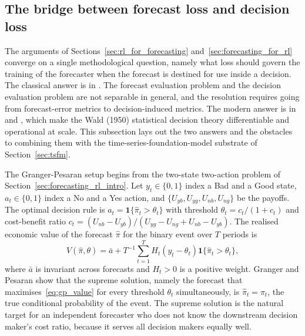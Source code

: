 \subsection{The bridge between forecast loss and decision loss}
\label{sec:bridge}

The arguments of Sections~\ref{sec:rl_for_forecasting} and~\ref{sec:forecasting_for_rl}
converge on a single methodological question, namely what loss should govern the
training of the forecaster when the forecast is destined for use inside a
decision. The classical answer is in \citet{GrangerPesaran2000}. The forecast
evaluation problem and the decision evaluation problem are not separable in
general, and the resolution requires going from forecast-error metrics to
decision-induced metrics. The modern answer is in
\citet{ElmachtoubGrigas2022} and \citet{DontiAmosKolter2017}, which make the
Wald (1950) statistical decision theory differentiable and operational at
scale. This subsection lays out the two answers and the obstacles to combining
them with the time-series-foundation-model substrate of
Section~\ref{sec:tsfm}.

The Granger-Pesaran setup begins from the two-state two-action problem of
Section~\ref{sec:forecasting_rl_intro}. Let $y_t \in \{0, 1\}$ index a Bad and
a Good state, $a_t \in \{0, 1\}$ index a No and a Yes action, and
$\{U_{yb}, U_{yg}, U_{nb}, U_{ng}\}$ be the payoffs. The optimal decision rule
is $a_t = \mathbf 1\{\hat\pi_t > \theta_t\}$ with threshold
$\theta_t = c_t / (1 + c_t)$ and cost-benefit ratio
$c_t = (U_{nb} - U_{yb}) / (U_{yg} - U_{ng} + U_{nb} - U_{yb})$. The realised
economic value of the forecast $\hat\pi$ for the binary event over $T$ periods
is
\begin{equation}
V(\hat\pi, \theta) = \bar a +
  T^{-1} \sum_{t=1}^T H_t (y_t - \theta_t)
  \mathbf 1\{\hat\pi_t > \theta_t\},
\label{eq:gp_value}
\end{equation}
where $\bar a$ is invariant across forecasts and $H_t > 0$ is a positive
weight. Granger and Pesaran show that the supreme solution, namely the
forecast that maximises~\eqref{eq:gp_value} for every threshold $\theta_t$
simultaneously, is $\hat\pi_t = \pi_t$, the true conditional probability of the
event. The supreme solution is the natural target for an independent
forecaster who does not know the downstream decision maker's cost ratio,
because it serves all decision makers equally well.

